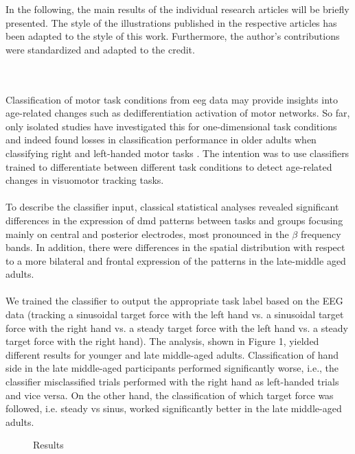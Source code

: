 In the following, the main results of the individual research articles will be briefly presented. The style of the illustrations published in the respective articles has been adapted to the style of this work. Furthermore, the author's contributions were standardized and adapted to the \gls{credit}. 

\\
\\
Classification of motor task conditions from \gls{eeg} data may provide insights into age-related changes such as dedifferentiation activation of motor networks. So far, only isolated studies have investigated this for one-dimensional task conditions and indeed found losses in classification performance in older adults when classifying right and left-handed motor tasks \cite{Chen2019}. The intention was to use classifiers trained to differentiate between different task conditions to detect age-related changes in visuomotor tracking tasks.\\
\\
To describe the classifier input, classical statistical analyses revealed significant differences in the expression of \gls{dmd} patterns between tasks and groups focusing mainly on central and posterior electrodes, most pronounced in the $\beta$ frequency bands. In addition, there were differences in the spatial distribution with respect to a more bilateral and frontal expression of the patterns in the late-middle aged adults.\\
\\
We trained the classifier to output the appropriate task label based on the EEG data (tracking a sinusoidal target force with the left hand vs. a sinusoidal target force with the right hand vs. a steady target force with the left hand vs. a steady target force with the right hand). The analysis, shown in Figure 1, yielded different results for younger and late middle-aged adults. Classification of hand side in the late middle-aged participants performed significantly worse, i.e., the classifier misclassified trials performed with the right hand as left-handed trials and vice versa. On the other hand, the classification of which target force was followed, i.e. steady vs sinus, worked significantly better in the late middle-aged adults. 

\begin{figure}[h]
\begin{center}

\caption[Reuslts]{Results}
\label{fig:results1}
\end{center}
\end{figure}

